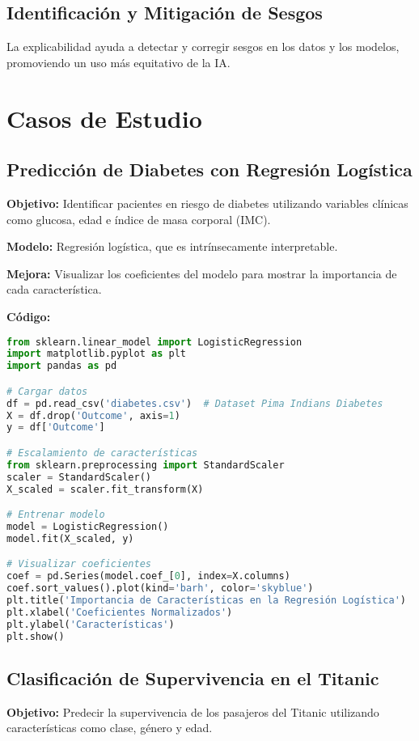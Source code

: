 \begin{refsection}
\subsection{Identificación y Mitigación de Sesgos}
La explicabilidad ayuda a detectar y corregir sesgos en los datos y los modelos, promoviendo un uso más equitativo de la IA.

\section{Casos de Estudio}
\subsection{Predicción de Diabetes con Regresión Logística}
\textbf{Objetivo:} Identificar pacientes en riesgo de diabetes utilizando variables clínicas como glucosa, edad e índice de masa corporal (IMC).

\textbf{Modelo:} Regresión logística, que es intrínsecamente interpretable.

\textbf{Mejora:} Visualizar los coeficientes del modelo para mostrar la importancia de cada característica.

\textbf{Código:}
\begin{lstlisting}[language=Python]
from sklearn.linear_model import LogisticRegression
import matplotlib.pyplot as plt
import pandas as pd

# Cargar datos
df = pd.read_csv('diabetes.csv')  # Dataset Pima Indians Diabetes
X = df.drop('Outcome', axis=1)
y = df['Outcome']

# Escalamiento de características
from sklearn.preprocessing import StandardScaler
scaler = StandardScaler()
X_scaled = scaler.fit_transform(X)

# Entrenar modelo
model = LogisticRegression()
model.fit(X_scaled, y)

# Visualizar coeficientes
coef = pd.Series(model.coef_[0], index=X.columns)
coef.sort_values().plot(kind='barh', color='skyblue')
plt.title('Importancia de Características en la Regresión Logística')
plt.xlabel('Coeficientes Normalizados')
plt.ylabel('Características')
plt.show()
\end{lstlisting}

\subsection{Clasificación de Supervivencia en el Titanic}
\textbf{Objetivo:} Predecir la supervivencia de los pasajeros del Titanic utilizando características como clase, género y edad.


\end{refsection}
